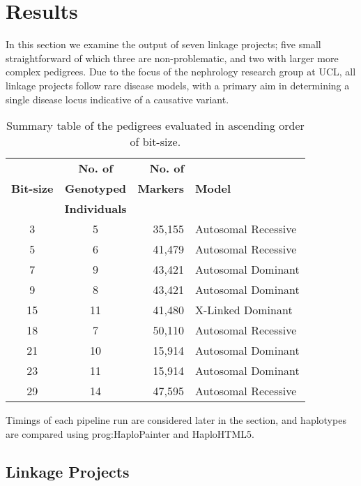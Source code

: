 \chapter{Results}

In this section we examine the output of seven linkage projects; five small straightforward of which three are non-problematic, and two with larger more complex pedigrees. Due to the focus of the nephrology research group at UCL, all linkage projects follow rare disease models, with a primary aim in determining a single disease locus indicative of a causative variant.

\begin{table}[h]
\begin{center}
\begin{tabular}{ c c r l } \toprule
              & \textbf{No. of}      & \textbf{No. of}  &                  \\
\textbf{Bit-size} & \textbf{Genotyped}   & \textbf{Markers} & \textbf{Model} \\
              & \textbf{Individuals} &                  &                  \\
\midrule
3 & 5 & 35,155 & Autosomal Recessive \\
5 & 6 & 41,479 & Autosomal Recessive \\
7 & 9 & 43,421 & Autosomal Dominant \\
9 & 8 & 43,421 & Autosomal Dominant \\
15 & 11 & 41,480 & X-Linked Dominant \\
18 & 7 & 50,110 & Autosomal Recessive \\
21 & 10 & 15,914 & Autosomal Dominant \\
23 & 11 & 15,914 & Autosomal Dominant \\
29 & 14 & 47,595 & Autosomal Recessive \\
\hline
\end{tabular}
\end{center}
\caption[Pedigrees by Bit-Size]{Summary table of the pedigrees evaluated in ascending order of bit-size.}\label{table:res:evaluated}
\end{table}

\vspace{-10pt}

Timings of each pipeline run are considered later in the section, and haplotypes are compared using \gls{prog:HaploPainter} and HaploHTML5.


\section{Linkage Projects}

